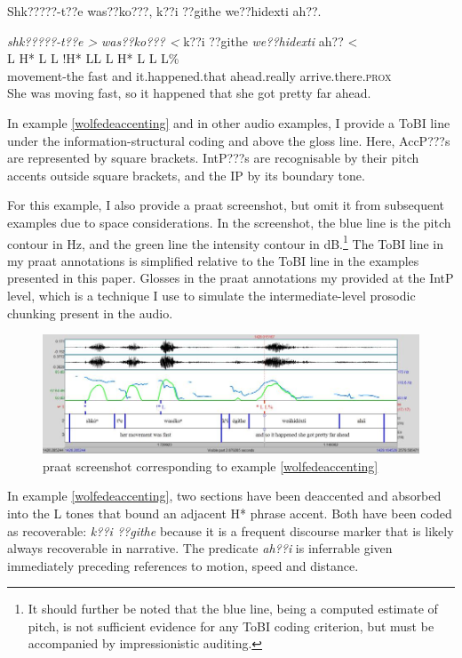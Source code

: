 \documentclass[output=paper]{LSP/langsci}
\begin{document}
\ea\label{wolfedeaccenting}
Shk?????-t??e was??ko???, k??i ??githe we??hidexti ah??.\footnotemark

\glll 	\emph{shk?????-t??e >}	\emph{was??ko??? <}		k??i 		??githe 		\emph{we??hidexti}		{ah?? <}\\
	{\ob L H* L\cb}		{\ob L !H* L\cb{}L}		{\ob L}	{}			{H* L}				{\cb{}L L\%}\\
	movement-the 		fast 				and 		it.happened.that 	ahead.really	 		arrive.there.\textsc{prox}\\
\glt She was moving fast, so it happened that she got pretty far ahead.
\z

In example \ref{wolfedeaccenting} and in other audio examples, I provide a ToBI line under the information-structural coding and above the gloss line. Here, AccP???s are represented by square brackets. IntP???s are recognisable by their pitch accents outside square brackets, and the IP by its boundary tone. 

For this example, I also provide a praat screenshot, but omit it from subsequent examples due to space considerations. In the screenshot, the blue line is the pitch contour in Hz, and the green line the intensity contour in dB.\footnote{It should further be noted that the blue line, being a computed estimate of pitch, is not sufficient evidence for any ToBI coding criterion, but must be accompanied by impressionistic auditing.} The ToBI line in my praat annotations is simplified relative to the ToBI line in the examples presented in this paper. Glosses in the praat annotations my provided at the IntP level, which is a technique I use to simulate the intermediate-level prosodic chunking present in the audio.

\begin{figure}\includegraphics[width=12cm]{figures/Gordon1}\caption{praat screenshot corresponding to example \ref{wolfedeaccenting}}\label{wolfedeaccentingscreenshot}\end{figure}

In example \ref{wolfedeaccenting}, two sections have been deaccented and absorbed into the L tones that bound an adjacent H* phrase accent. Both have been coded as recoverable: \textit{k??i ??githe} because it is a frequent discourse marker that is likely always recoverable in narrative. The predicate \textit{ah??i} is inferrable given immediately preceding references to motion, speed and distance.
\end{document}
